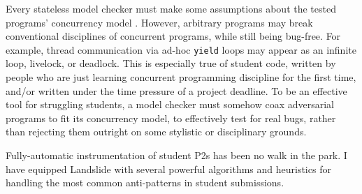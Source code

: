 Every stateless model checker must make some assumptions about the tested programs' concurrency model \cite{chess}.
However, arbitrary programs may break conventional disciplines of concurrent programs, while still being bug-free.
For example, thread communication via ad-hoc {\tt yield} loops may appear as an infinite loop, livelock, or deadlock.
This is especially true of student code,
written by people who are just learning concurrent programming discipline for the first time,
and/or written under the time pressure of a project deadline.
To be an effective tool for struggling students,
a model checker must somehow coax adversarial programs to fit its concurrency model, to effectively test for real bugs,
rather than rejecting them outright on some stylistic or disciplinary grounds.

Fully-automatic instrumentation of student P2s has been no walk in the park.
I have equipped Landslide with several powerful algorithms and heuristics for handling the most common anti-patterns in student submissions.

